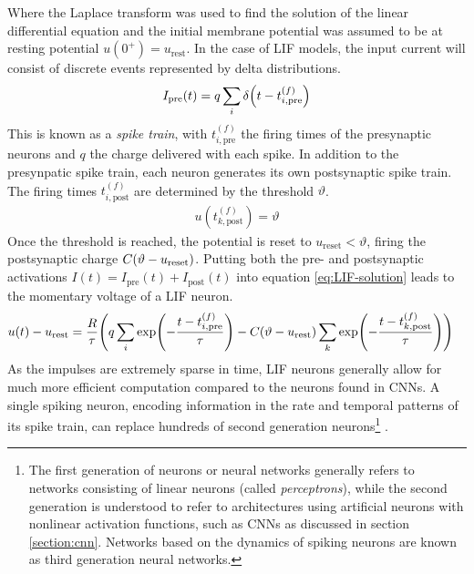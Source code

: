 Where the Laplace transform was used to find the solution of the linear differential equation and the initial membrane potential was assumed to be at resting potential $u(0^+)=u_\mathrm{rest}$. In the case of LIF models, the input current will consist of discrete events represented by delta distributions.
\begin{align}
    I_\mathrm{pre}(t) = q\sum_i \delta\qty(t-t_{i,\mathrm{pre}}^{(f)})
\end{align}
This is known as a \emph{spike train}, with $t_{i,\mathrm{pre}}^{(f)}$ the firing times of the presynaptic neurons and $q$ the charge delivered with each spike. In addition to the presynpatic spike train, each neuron generates its own postsynaptic spike train. The firing times $t_{i,\mathrm{post}}^{(f)}$ are determined by the threshold $\vartheta$.
\begin{align}
    u(t_{k,\mathrm{post}}^{(f)})=\vartheta
\end{align}
Once the threshold is reached, the potential is reset to $u_\mathrm{reset} < \vartheta$, firing the postsynaptic charge $C\qty(\vartheta-u_\mathrm{reset})$. Putting both the pre- and postsynaptic activations $I(t)=I_\mathrm{pre}(t)+I_\mathrm{post}(t)$ into equation \ref{eq:LIF-solution} leads to the momentary voltage of a LIF neuron.
\begin{align}
    u(t)-u_\mathrm{rest} &= \frac{R}{\tau}\qty(q \sum_i \exp(-\frac{t-t_{i,\mathrm{pre}}^{(f)}}{\tau})-C\qty(\vartheta-u_\mathrm{rest})\sum_k\exp(-\frac{t-t_{k,\mathrm{post}}^{(f)}}{\tau}))
\end{align}
As the impulses are extremely sparse in time, LIF neurons generally allow for much more efficient computation compared to the neurons found in CNNs. A single spiking neuron, encoding information in the rate and temporal patterns of its spike train, can replace hundreds of second generation neurons\footnote{The first generation of neurons or neural networks generally refers to networks consisting of linear neurons (called \emph{perceptrons}), while the second generation is understood to refer to architectures using artificial neurons with nonlinear activation functions, such as CNNs as discussed in section \ref{section:cnn}. Networks based on the dynamics of spiking neurons are known as third generation neural networks.} \cite{gerstner2002spiking,maass1997networks,rieke1999spikes}.
